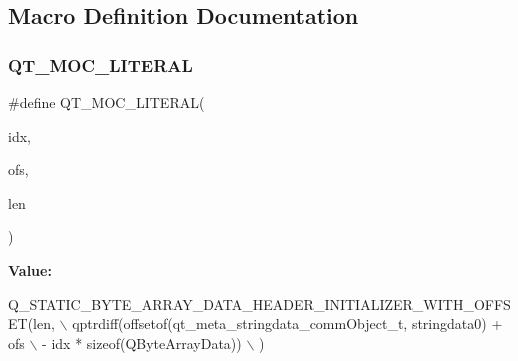 \subsection{Macro Definition Documentation}
\mbox{\label{_debug_2moc__communication_8cpp_a75bb9482d242cde0a06c9dbdc6b83abe}} 
\subsubsection{Q\+T\+\_\+\+M\+O\+C\+\_\+\+L\+I\+T\+E\+R\+AL}
{\footnotesize\ttfamily \#define Q\+T\+\_\+\+M\+O\+C\+\_\+\+L\+I\+T\+E\+R\+AL(\begin{DoxyParamCaption}\item[{}]{idx,  }\item[{}]{ofs,  }\item[{}]{len }\end{DoxyParamCaption})}

{\bfseries Value\+:}
\begin{DoxyCode}
Q\_STATIC\_BYTE\_ARRAY\_DATA\_HEADER\_INITIALIZER\_WITH\_OFFSET(len, \(\backslash\)
    qptrdiff(offsetof(qt_meta_stringdata_commObject_t, stringdata0) + ofs \(\backslash\)
        - idx * \textcolor{keyword}{sizeof}(QByteArrayData)) \(\backslash\)
    )
\end{DoxyCode}
